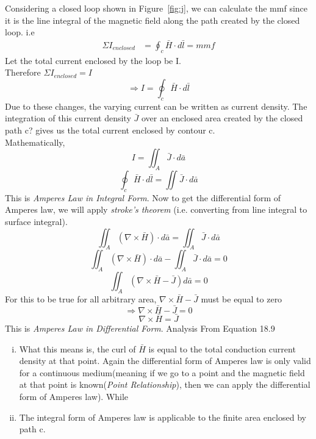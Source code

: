 Considering a closed loop shown in Figure~\ref{fig:j}, we can calculate the mmf since it is the line integral of the magnetic field along the path created by the closed loop. i.e
\begin{align*}
\Sigma I_{enclosed} &= \oint_c\bar{H}\cdot d\bar{l} = mmf
\end{align*}
Let the total current enclosed by the loop be I.\\
Therefore $\Sigma I_{enclosed} = I$
\begin{equation*}
\Rightarrow I = \oint_c\bar{H}\cdot d\bar{l}
\end{equation*}
Due to these changes, the varying current can be written as current density. The integration of this current density $\bar{J}$ over an enclosed area created by the closed path c? gives us the total current enclosed by contour c.\\
Mathematically,
\begin{equation*}
I = \iint_A\bar{J} \cdot d\bar{a}
\end{equation*}
\begin{equation}
\boxed{\oint_c\bar{H} \cdot d\bar{l} = \iint\bar{J} \cdot d\bar{a}}
\end{equation}
This is \emph{Amperes Law in Integral Form}. Now to get the differential form of Amperes law, we will apply \emph{stroke's theorem} (i.e. converting from line integral to surface integral).
\begin{equation*}
\iint_A(\nabla \times \bar{H}) \cdot d\bar{a} = \iint_A\bar{J} \cdot d\bar{a}
\end{equation*}
\begin{equation*}
\iint_A(\nabla \times \bar{H}) \cdot d\bar{a} - \iint_A\bar{J} \cdot d\bar{a} = 0
\end{equation*}
\begin{equation*}
\iint_A(\nabla \times \bar{H} - \bar{J})d\bar{a} = 0
\end{equation*} 
For this to be true for all arbitrary area, $\nabla \times \bar{H} - \bar{J}$ must be equal to zero
\begin{equation*}
\Rightarrow \nabla \times \bar{H} - \bar{J} = 0
\end{equation*}
\begin{equation}
\boxed{\nabla \times \bar{H} = \bar{J}}
\end{equation}
This is \emph{Amperes Law in Differential Form}. Analysis From Equation 18.9
\begin{enumerate}[(i)]
\item What this means is, the curl of $\bar{H}$ is equal to the total conduction current density at that point. Again the differential form of Amperes law is only valid for a continuous medium(meaning if we go to a point and the magnetic field at that point is known(\emph{Point Relationship}), then we can apply the differential form of Amperes law). While
\item The integral form of Amperes law is applicable to the finite area enclosed by path c.
\end{enumerate}


